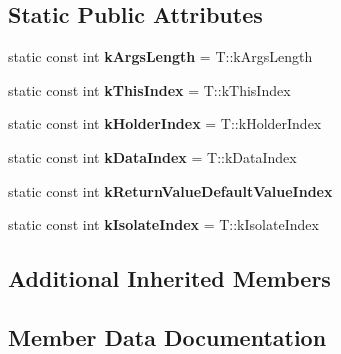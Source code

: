 \subsection*{Static Public Attributes}
\begin{DoxyCompactItemize}
\item 
\hypertarget{classv8_1_1internal_1_1_property_callback_arguments_a000d4d0ae04aa54cd2351d613888b755}{}static const int {\bfseries k\+Args\+Length} = T\+::k\+Args\+Length\label{classv8_1_1internal_1_1_property_callback_arguments_a000d4d0ae04aa54cd2351d613888b755}

\item 
\hypertarget{classv8_1_1internal_1_1_property_callback_arguments_ae7299585bfeb9b812b2ba7e09478f421}{}static const int {\bfseries k\+This\+Index} = T\+::k\+This\+Index\label{classv8_1_1internal_1_1_property_callback_arguments_ae7299585bfeb9b812b2ba7e09478f421}

\item 
\hypertarget{classv8_1_1internal_1_1_property_callback_arguments_a59f06b3272ceed23bd3599e46acd0a0f}{}static const int {\bfseries k\+Holder\+Index} = T\+::k\+Holder\+Index\label{classv8_1_1internal_1_1_property_callback_arguments_a59f06b3272ceed23bd3599e46acd0a0f}

\item 
\hypertarget{classv8_1_1internal_1_1_property_callback_arguments_a6158df38ec13a673626065fed0fcc2a1}{}static const int {\bfseries k\+Data\+Index} = T\+::k\+Data\+Index\label{classv8_1_1internal_1_1_property_callback_arguments_a6158df38ec13a673626065fed0fcc2a1}

\item 
static const int {\bfseries k\+Return\+Value\+Default\+Value\+Index}
\item 
\hypertarget{classv8_1_1internal_1_1_property_callback_arguments_a77f1ec88fc9fde2de666852361e1a14c}{}static const int {\bfseries k\+Isolate\+Index} = T\+::k\+Isolate\+Index\label{classv8_1_1internal_1_1_property_callback_arguments_a77f1ec88fc9fde2de666852361e1a14c}

\end{DoxyCompactItemize}
\subsection*{Additional Inherited Members}


\subsection{Member Data Documentation}
\hypertarget{classv8_1_1internal_1_1_property_callback_arguments_af4efd2b3fe140e2f70f82a004ea9cd4a}{}
